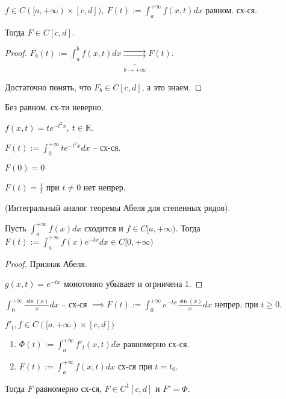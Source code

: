 \begin{theorem}
    $f \in C([a, +\infty) \times [c, d]), \ F(t) := \int_{a}^{+\infty} { f(x, t) dx }$ равном. сх-ся.

    Тогда $F \in C[c, d]$.
\end{theorem}
\begin{proof}
    $F_b(t) := \int_{a}^{b} { f(x, t) dx } \underbrace{\rightrightarrows}_{b \rightarrow +\infty} F(t)$.

    Достаточно понять, что $F_b \in C[c, d]$, а это знаем.
\end{proof}

\begin{remark}
    Без равном. сх-ти неверно.

    $f(x, t) = t e^{-t^2 x}, \ t \in \mathbb{R}$.

    $F(t) := \int_{0}^{+\infty} { t e^{-t^2 x} dx }$ -- сх-ся.

    $F(0) = 0$

    $F(t) = \frac{1}{t}$ при $t \not = 0$ нет непрер.
\end{remark}

\begin{theorem}
    (Интегральный аналог теоремы Абеля для степенных рядов).

    Пусть $\int_{a}^{+\infty} { f(x) dx }$ сходится и $f \in C[a, +\infty)$. Тогда $F(t) := \int_{a}^{+\infty} { f(x) e^{-tx} dx } \in C[0, +\infty)$
\end{theorem}

\begin{proof}
    Признак Абеля.

    $g(x, t) = e^{-tx}$ монотонно убывает и огрничена 1.
\end{proof}

\begin{example}
    $\int_{0}^{+\infty} { \frac{\sin(x)}{x} dx }$ -- сх-ся $\implies F(t) := \int_{0}^{+\infty} { e^{-tx} \frac{\sin(x)}{x} dx }$ непрер. при $t \geq 0$.
\end{example}

\begin{theorem}
    $f'_t, f \in C([a, +\infty) \times [c, d])$

    \begin{enumerate}
        \item {
            $\Phi(t) := \int_{a}^{+\infty} { f'_t (x, t) dx }$ равномерно сх-ся.
        }
        \item {
            $F(t) := \int_{a}^{+\infty} { f(x, t) dx }$ сх-ся при $t = t_0$.
        }
    \end{enumerate}

    Тогда $F$ равномерно сх-ся, $F \in C^1[c, d]$ и $F' = \Phi$.
\end{theorem}

